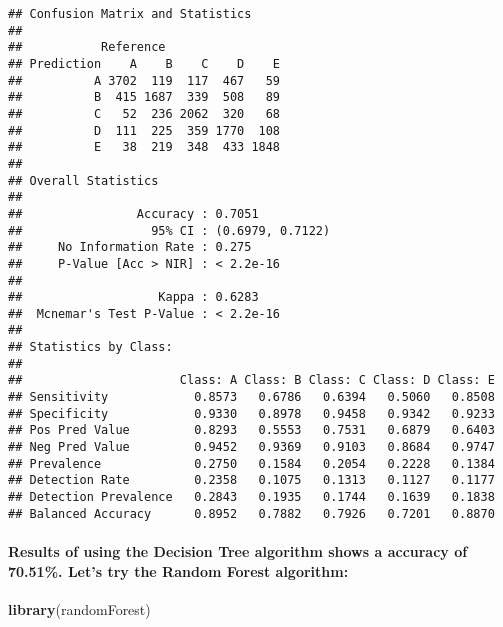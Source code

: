 \documentclass[]{article}
\newenvironment{Shaded}{\begin{snugshade}}{\end{snugshade}}
\newcommand{\KeywordTok}[1]{\textcolor[rgb]{0.13,0.29,0.53}{\textbf{#1}}}
\newcommand{\DecValTok}[1]{\textcolor[rgb]{0.00,0.00,0.81}{#1}}
\newcommand{\StringTok}[1]{\textcolor[rgb]{0.31,0.60,0.02}{#1}}
\newcommand{\OperatorTok}[1]{\textcolor[rgb]{0.81,0.36,0.00}{\textbf{#1}}}
\newcommand{\NormalTok}[1]{#1}
\let\oldparagraph\paragraph
\renewcommand{\paragraph}[1]{\oldparagraph{#1}\mbox{}}
\begin{document}
\begin{verbatim}
## Confusion Matrix and Statistics
## 
##           Reference
## Prediction    A    B    C    D    E
##          A 3702  119  117  467   59
##          B  415 1687  339  508   89
##          C   52  236 2062  320   68
##          D  111  225  359 1770  108
##          E   38  219  348  433 1848
## 
## Overall Statistics
##                                           
##                Accuracy : 0.7051          
##                  95% CI : (0.6979, 0.7122)
##     No Information Rate : 0.275           
##     P-Value [Acc > NIR] : < 2.2e-16       
##                                           
##                   Kappa : 0.6283          
##  Mcnemar's Test P-Value : < 2.2e-16       
## 
## Statistics by Class:
## 
##                      Class: A Class: B Class: C Class: D Class: E
## Sensitivity            0.8573   0.6786   0.6394   0.5060   0.8508
## Specificity            0.9330   0.8978   0.9458   0.9342   0.9233
## Pos Pred Value         0.8293   0.5553   0.7531   0.6879   0.6403
## Neg Pred Value         0.9452   0.9369   0.9103   0.8684   0.9747
## Prevalence             0.2750   0.1584   0.2054   0.2228   0.1384
## Detection Rate         0.2358   0.1075   0.1313   0.1127   0.1177
## Detection Prevalence   0.2843   0.1935   0.1744   0.1639   0.1838
## Balanced Accuracy      0.8952   0.7882   0.7926   0.7201   0.8870
\end{verbatim}

\begin{Shaded}
\end{Shaded}

\paragraph{Results of using the Decision Tree algorithm shows a accuracy
of 70.51\%. Let's try the Random Forest
algorithm:}\label{results-of-using-the-decision-tree-algorithm-shows-a-accuracy-of-70.51.-lets-try-the-random-forest-algorithm}

\begin{Shaded}
\begin{Highlighting}[]
\KeywordTok{library}\NormalTok{(randomForest)}
\end{Highlighting}
\end{Shaded}
\end{document}
